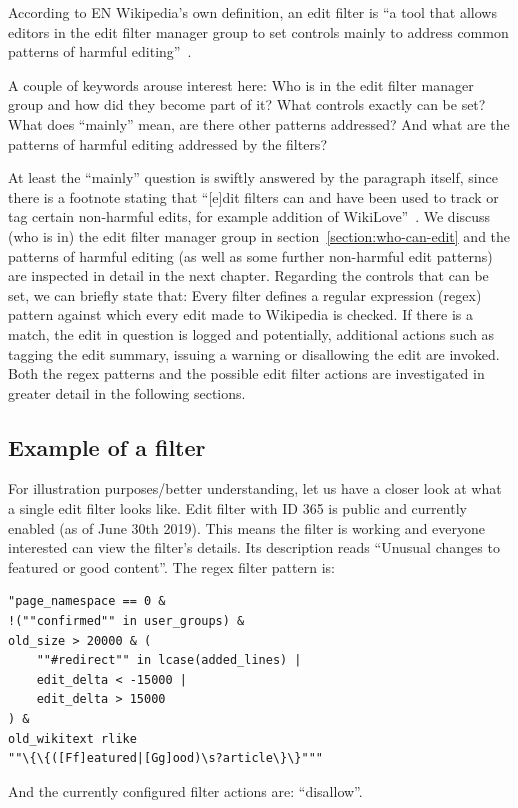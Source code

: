 According to EN Wikipedia's own definition, an edit filter is ``a tool that allows editors in the edit filter manager group to set controls mainly to address common patterns of harmful editing''~\cite{Wikipedia:EditFilter}.

A couple of keywords arouse interest here: %
Who is in the edit filter manager group and how did they become part of it?
What controls exactly can be set?
What does ``mainly'' mean, are there other patterns addressed?
And what are the patterns of harmful editing addressed by the filters?

At least the ``mainly'' question is swiftly answered by the paragraph itself, since there is a footnote stating that ``[e]dit filters can and have been used to track or tag certain non-harmful edits, for example addition of WikiLove''~\cite{Wikipedia:EditFilter}.
We discuss (who is in) the edit filter manager group in section~\ref{section:who-can-edit} and the patterns of harmful editing (as well as some further non-harmful edit patterns) are inspected in detail in the next chapter.
Regarding the controls that can be set, we can briefly state that:
Every filter defines a regular expression (regex) pattern against which every edit made to Wikipedia is checked.
If there is a match, the edit in question is logged and potentially, additional actions such as tagging the edit summary, issuing a warning or disallowing the edit are invoked.
Both the regex patterns and the possible edit filter actions are investigated in greater detail in the following sections.

\subsection{Example of a filter}

For illustration purposes/better understanding, let us have a closer look at what a single edit filter looks like.
Edit filter with ID 365 is public and currently enabled (as of June 30th 2019).
This means the filter is working and everyone interested can view the filter's details.
Its description reads ``Unusual changes to featured or good content''.
The regex filter pattern is:
\begin{verbatim}
"page_namespace == 0 &
!(""confirmed"" in user_groups) &
old_size > 20000 & (
    ""#redirect"" in lcase(added_lines) |
    edit_delta < -15000 |
    edit_delta > 15000
) &
old_wikitext rlike
""\{\{([Ff]eatured|[Gg]ood)\s?article\}\}"""
\end{verbatim}
And the currently configured filter actions are: ``disallow''.


